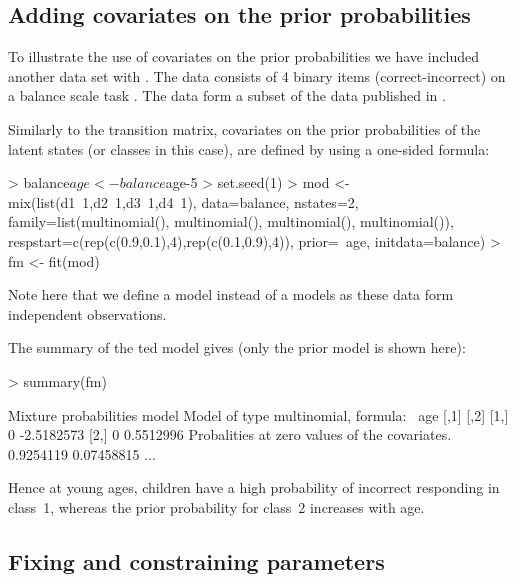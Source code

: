 \documentclass[article]{jss}
\begin{document}
\subsection{Adding covariates on the prior probabilities}

To illustrate the use of covariates on the prior probabilities we have included
another data set with . The  data consists 
of 4 binary items (correct-incorrect) on a balance scale task 
\citet{Siegler1981}. The data form a subset of the data published in 
\citet{Jansen2002}. 

Similarly to the transition matrix, covariates on the prior 
probabilities of the latent states (or classes in this case), are 
defined by using a one-sided formula: 
\begin{CodeChunk}
\begin{CodeInput}
> balance$age <- balance$age-5
> set.seed(1)
> mod <- mix(list(d1~1,d2~1,d3~1,d4~1), data=balance, nstates=2,
    family=list(multinomial(), multinomial(), multinomial(),
    multinomial()), respstart=c(rep(c(0.9,0.1),4),rep(c(0.1,0.9),4)), 
    prior=~age, initdata=balance)
> fm <- fit(mod)
\end{CodeInput}
\end{CodeChunk}
Note here that we define a  model instead of a 
models as these data form independent observations.

The summary of the ted model gives (only the prior model is 
shown here): 
\begin{CodeChunk}
\begin{CodeInput}
> summary(fm)
\end{CodeInput}
\begin{CodeOutput}
Mixture probabilities model 
Model of type multinomial, formula: ~age
     [,1]       [,2]
[1,]    0 -2.5182573
[2,]    0  0.5512996
Probalities at zero values of the covariates.
0.9254119 0.07458815 
...
\end{CodeOutput}
\end{CodeChunk}	
Hence at young ages, children have a high probability of incorrect 
responding in class~1, whereas the prior probability for class~2 
increases with age. 


\subsection{Fixing and constraining parameters}
\end{document}
